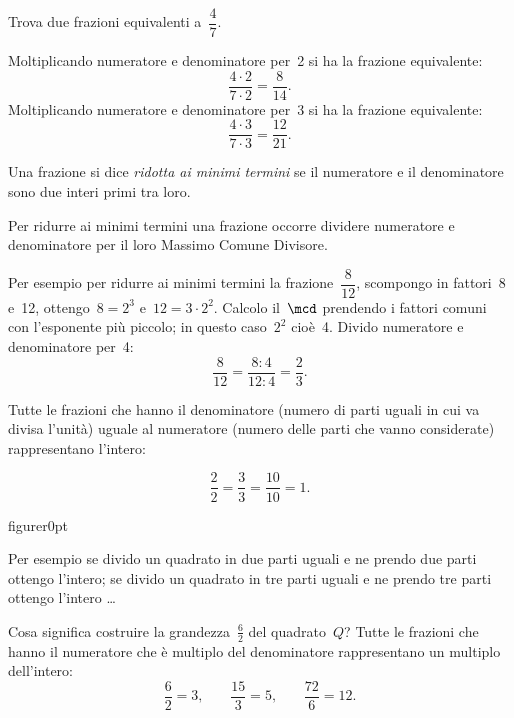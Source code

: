 \begin{exrig}
 \begin{esempio}
 Trova due frazioni equivalenti a~$\dfrac{4}{7}$.

Moltiplicando numeratore e denominatore per~2 si ha la frazione equivalente:
\[\frac{4\cdot2}{7\cdot2}=\frac{8}{14}.\]
Moltiplicando numeratore e denominatore per~3 si ha la frazione equivalente:
\[\frac{4\cdot3}{7\cdot3}=\frac{12}{21}.\]
 \end{esempio}
\end{exrig}

\begin{definizione}
Una frazione si dice \emph{ridotta ai minimi termini} se il numeratore e il denominatore sono due interi primi tra loro.
\end{definizione}

Per ridurre ai minimi termini una frazione occorre dividere numeratore e denominatore per il loro Massimo Comune Divisore.

Per esempio per ridurre ai minimi termini la frazione~$\dfrac{8}{12}$, scompongo in fattori~8 e~12, ottengo~$8=2^3$ e~$12=3\cdot2^2$.
Calcolo il~$\mcd$ prendendo i fattori comuni con l'esponente più piccolo; in questo caso~$2^2$ cioè~4.
Divido numeratore e denominatore per~4:
\[\frac{8}{12} = \frac{8:4}{12:4} = \frac{2}{3}.\]

Tutte le frazioni che hanno il denominatore (numero di parti uguali in cui va divisa l'unità) uguale al numeratore
(numero delle parti che vanno considerate) rappresentano l'intero:

\[\frac{2}{2}=\frac{3}{3}=\frac{10}{10}=1.\]

\begin{wrapfloat}{figure}{r}{0pt}
 
\end{wrapfloat}

Per esempio se divido un quadrato in due parti uguali e ne prendo due parti ottengo l'intero;
se divido un quadrato in tre parti uguali e ne prendo tre parti ottengo l'intero \ldots
\vspazio

Cosa significa costruire la grandezza~$\frac{6}{2}$ del quadrato~$Q$?
Tutte le frazioni che hanno il numeratore che è multiplo del denominatore rappresentano un multiplo dell'intero:
\[\frac{6}{2}=3\text{,}\qquad\frac{15}{3}=5\text{,}\qquad\frac{72}{6}=12.\]

